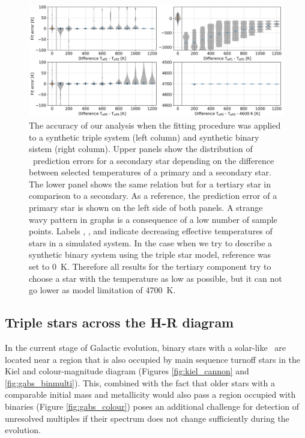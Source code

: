 \begin{figure}
	\centering
	\includegraphics[width=\textwidth]{three_stars_fit_sim_res_comb.png}
	\caption{The accuracy of our analysis when the fitting procedure was applied to a synthetic triple system (left column) and synthetic binary sistem (right column). Upper panels show the distribution of \Teff\ prediction errors for a secondary star depending on the difference between selected temperatures of a primary and a secondary star. The lower panel shows the same relation but for a tertiary star in comparison to a secondary. As a reference, the prediction error of a primary star is shown on the left side of both panels. A strange wavy pattern in graphs is a consequence of a low number of sample points. Labels , , and  indicate decreasing effective temperatures of stars in a simulated system. In the case when we try to describe a synthetic binary system using the triple star model, reference  was set to $0$~K. Therefore all results for the tertiary component try to choose a star with the temperature as low as possible, but it can not go lower as model limitation of 4700~K.}
	\label{fig:triple_sym_res}
\end{figure}

\subsection{Triple stars across the H-R diagram}
In the current stage of Galactic evolution, binary stars with a solar-like \Teff\ are located near a region that is also occupied by main sequence turnoff stars in the Kiel and colour-magnitude diagram (Figures \ref{fig:kiel_cannon} and \ref{fig:gabs_binmulti}). This, combined with the fact that older stars with a comparable initial mass and metallicity would also pass a region occupied with binaries (Figure \ref{fig:gabs_colour}) poses an additional challenge for detection of unresolved multiples if their spectrum does not change sufficiently during the evolution.

